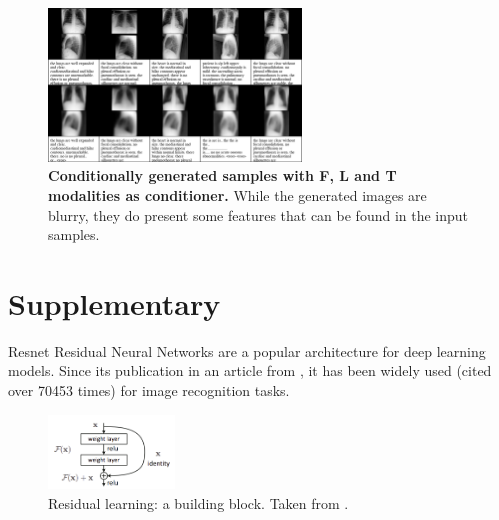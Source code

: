     \begin{frame}
        \begin{figure}
    \centering
    \includegraphics[width=0.6\textwidth, height = \textheight, keepaspectratio]{data/cond_gen/Lateral_PA_text}
    \caption{\tiny{
        \textbf{Conditionally generated samples with F, L and T modalities as conditioner.} While the generated images are blurry, they do present some features that can be found in the input samples.
    }}
    \label{fig:fig_cond_latPAtext}
\end{figure}
    \end{frame}
    
    \printbibliography
    
    \section{Supplementary}
    
    \begin{frame}{Resnet}
        Residual Neural Networks are a popular architecture for deep learning models.
        Since its publication in an article from \cite{he2016deep}, it has been widely used (cited over 70453 times) for image recognition tasks.
        \begin{figure}
            \includegraphics[width=0.3\textwidth, keepaspectratio]{slides/Residual_block}
            \caption{Residual learning: a building block. Taken from \cite{he2016deep}.}
        \end{figure}
    \end{frame}

